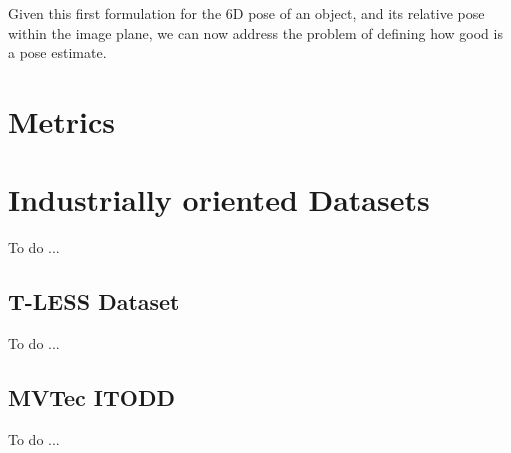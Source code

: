 Given this first formulation for the 6D pose of an object, and its relative pose within the image plane, we can now address the problem of defining how good is a pose estimate.

\section{Metrics}\label{sec:metrics}


\section{Industrially oriented Datasets}\label{sec:datasets}
To do ...

\subsection{T-LESS Dataset}\label{subsec:tless_dataset}
To do ...

\subsection{MVTec ITODD}\label{subsec:mvtex_itodd}
To do ...